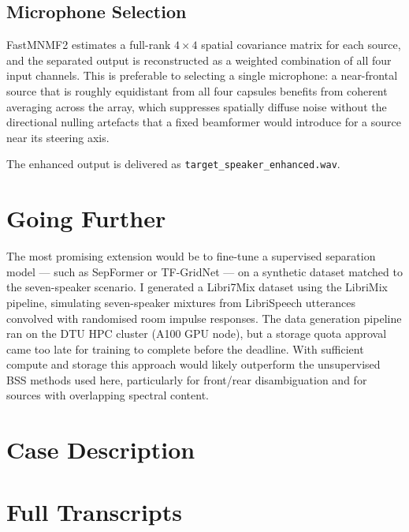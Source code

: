 \subsection{Microphone Selection}

FastMNMF2 estimates a full-rank $4\times4$ spatial covariance matrix for each source, and the separated output is reconstructed as a weighted combination of all four input channels. This is preferable to selecting a single microphone: a near-frontal source that is roughly equidistant from all four capsules benefits from coherent averaging across the array, which suppresses spatially diffuse noise without the directional nulling artefacts that a fixed beamformer would introduce for a source near its steering axis.

The enhanced output is delivered as \texttt{target\_speaker\_enhanced.wav}.

\section{Going Further}

The most promising extension would be to fine-tune a supervised separation model — such as SepFormer or TF-GridNet — on a synthetic dataset matched to the seven-speaker scenario. I generated a Libri7Mix dataset using the LibriMix pipeline, simulating seven-speaker mixtures from LibriSpeech utterances convolved with randomised room impulse responses. The data generation pipeline ran on the DTU HPC cluster (A100 GPU node), but a storage quota approval came too late for training to complete before the deadline. With sufficient compute and storage this approach would likely outperform the unsupervised BSS methods used here, particularly for front/rear disambiguation and for sources with overlapping spectral content.

\appendix
\section{Case Description}
\label{app:case}


\section{Full Transcripts}
\label{sec:transcripts}

